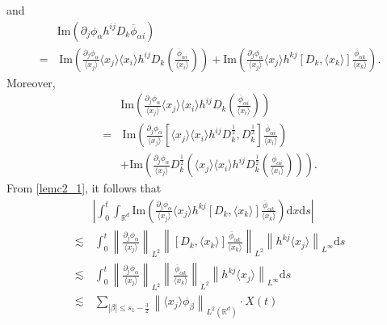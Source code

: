 \documentclass[10pt,twoside,a4paper]{article}
\numberwithin{equation}{section}\allowdisplaybreaks
\def\leq{\leqslant}
\begin{document}
and
\begin{align*} 
	&	\mathrm{Im} \left(   \partial_j \phi_{\alpha }  h^{ij}  D_k  \overline{\phi}_{\alpha i }\right)\nonumber\\
	=&\,\mathrm{Im} \left(   \frac{\partial_j \phi_{\alpha }  } {\langle x_j\rangle}  \langle x_j\rangle \langle x_i\rangle h^{ij}  D_k \left(\frac{\overline{\phi}_{\alpha i } } {\langle x_i\rangle}\right)\right)+\mathrm{Im} \left(   \frac{\partial_j \phi_{\alpha }  } {\langle x_j\rangle}  \langle x_j\rangle h^{kj} \left[ D_k ,\langle x_k\rangle\right]\frac{\overline{\phi}_{\alpha k } } {\langle x_k\rangle} \right). 
\end{align*}
Moreover,
\begin{align*}
	&\mathrm{Im} \left(   \frac{\partial_j \phi_{\alpha }  } {\langle x_j\rangle}  \langle x_j\rangle \langle x_i\rangle h^{ij}  D_k \left(\frac{\overline{\phi}_{\alpha i } } {\langle x_i\rangle}\right)\right)\nonumber\\
	=&\, \mathrm{Im} \left(    \frac{\partial_j \phi_{\alpha }  } {\langle x_j\rangle}  \left[ \langle x_j\rangle \langle x_i\rangle h^{ij}   D_k^{\frac12}, D_k^{\frac12} \right] \frac{\overline{\phi}_{\alpha i } } {\langle x_i\rangle}\right)\\
	&+\mathrm{Im} \left(   \frac{\partial_j \phi_{\alpha }  } {\langle x_j\rangle} D_k^{\frac12}\left ( \langle x_j\rangle\langle x_i\rangle h^{ij} D_k^{\frac12}   \left (\frac{\overline{\phi}_{\alpha i } } {\langle x_i\rangle}\right)\right)\right).\nonumber
\end{align*}
From \eqref{lemc2_1}, it follows that
\begin{align*} 
	&\left|\int_0^t\int_{\mathbb{R}^d}   \mathrm{Im} \left(   \frac{\partial_j \phi_{\alpha }  } {\langle x_j\rangle}  \langle x_j\rangle h^{kj} \left[ D_k ,\langle x_k\rangle\right]\frac{\overline{\phi}_{\alpha k } } {\langle x_k\rangle} \right)\mathrm{d} x \mathrm{d} s\right|\\
	\lesssim &\,\int_0^t\left\| \frac{\partial_j \phi_{\alpha }  } {\langle x_j\rangle}\right \|_{L^2}  \left\|    \left[ D_k ,\langle x_k\rangle\right]\frac{\overline{\phi}_{\alpha k } } {\langle x_k\rangle}\right\|_{L^2} \left\|  h^{kj}  \langle x_j\rangle \right\|_{L^\infty} \mathrm{d} s\nonumber\\
	\lesssim &\,\int_0^t \left\| \frac{\partial_j \phi_{\alpha }  } {\langle x_j\rangle}\right \|_{L^2}  \left\|     \frac{\overline{\phi}_{\alpha k } } {\langle x_k\rangle}\right\|_{L^2} \left\|   h^{kj}  \langle x_j\rangle \right\|_{L^\infty} \mathrm{d} s \nonumber\\
	\lesssim &\,\sum_{|\beta| \leq s_1-\frac 32}\left\| \langle x_j\rangle \phi_{\beta}\right\|_{L^2(\mathbb{R}^d)} \cdot X(t)\nonumber
\end{align*}
\end{document}
